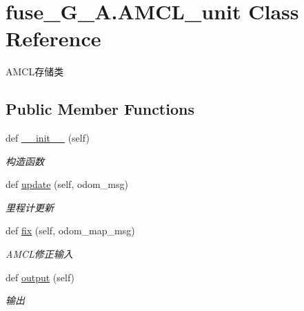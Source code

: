 \hypertarget{classfuse___g___a_1_1_a_m_c_l__unit}{}\section{fuse\+\_\+\+G\+\_\+\+A.\+A\+M\+C\+L\+\_\+unit Class Reference}
\label{classfuse___g___a_1_1_a_m_c_l__unit}


A\+M\+C\+L存储类  


\subsection*{Public Member Functions}
\begin{DoxyCompactItemize}
\item 
def \hyperlink{classfuse___g___a_1_1_a_m_c_l__unit_a649b220b24560e61c889c00692062ecf}{\+\_\+\+\_\+init\+\_\+\+\_\+} (self)
\begin{DoxyCompactList}\small\item\em 构造函数 \end{DoxyCompactList}\item 
def \hyperlink{classfuse___g___a_1_1_a_m_c_l__unit_ae382917f4b9d97b2d392ffb4036f8268}{update} (self, odom\+\_\+msg)
\begin{DoxyCompactList}\small\item\em 里程计更新 \end{DoxyCompactList}\item 
def \hyperlink{classfuse___g___a_1_1_a_m_c_l__unit_a0e727db571dee1250185e4c00e239030}{fix} (self, odom\+\_\+map\+\_\+msg)
\begin{DoxyCompactList}\small\item\em A\+M\+C\+L修正输入 \end{DoxyCompactList}\item 
def \hyperlink{classfuse___g___a_1_1_a_m_c_l__unit_a6f69c46a7f160ce28b52991b28fad400}{output} (self)
\begin{DoxyCompactList}\small\item\em 输出 \end{DoxyCompactList}\end{DoxyCompactItemize}
